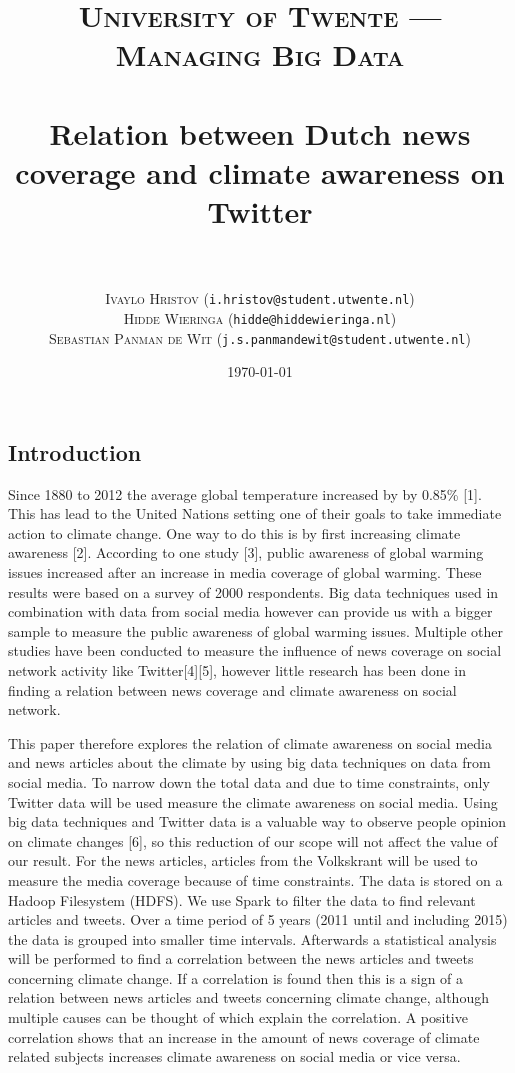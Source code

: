 \documentclass[paper=a4, fontsize=9px]{scrartcl} %
\title{	
\normalfont \normalsize 
\textsc{University of Twente --- Managing Big Data} \\ [5pt] %
\horrule{0.5pt} \\[0.4cm] %
\huge Relation between Dutch news coverage and climate awareness on Twitter \\ %
\horrule{2pt} \\[0.0cm] %
}
\author{{\small \textsc{Ivaylo Hristov} (\texttt{i.hristov@student.utwente.nl})}\\{\small \textsc{Hidde Wieringa} (\texttt{hidde@hiddewieringa.nl})}\\{\small \textsc{Sebastian Panman de Wit} (\texttt{j.s.panmandewit@student.utwente.nl})}} %
\date{\normalsize\today} %
\numberwithin{equation}{section} %
\numberwithin{figure}{section} %
\numberwithin{table}{section} %
\begin{document}
\maketitle %

\begin{multicols}{2}

\section{Introduction}

Since 1880 to 2012 the average global temperature increased by by 0.85\% [1]. This has lead to the United Nations setting one of their goals to take immediate action to climate change. One way to do this is by first increasing climate awareness [2]. According to one study [3], public awareness of global warming issues increased after an increase in media coverage of global warming. These results were based on a survey of 2000 respondents. Big data techniques used in combination with data from social media however can provide us with a bigger sample to measure the public awareness of global warming issues. Multiple other studies have been conducted to measure the influence of news coverage on social network activity like Twitter[4][5], however little research has been done in finding a relation between news coverage and climate awareness on social network.

This paper therefore explores the relation of climate awareness on social media and news articles about the climate by using big data techniques on data from social media. To narrow down the total data and due to time constraints, only Twitter data will be used measure the climate awareness on social media. Using big data techniques and Twitter data is a valuable way to observe people opinion on climate changes [6], so this reduction of our scope will not affect the value of our result. For the news articles, articles from the Volkskrant will be used to measure the media coverage because of time constraints. The data is stored on a Hadoop Filesystem (HDFS). We use Spark to filter the data to find relevant articles and tweets. Over a time period of 5 years (2011 until and including 2015) the data is grouped into smaller time intervals. Afterwards a statistical analysis will be performed to find a correlation between the news articles and tweets concerning climate change. If a correlation is found then this is a sign of a relation between news articles and tweets concerning climate change, although multiple causes can be thought of which explain the correlation. A positive correlation shows that an increase in the amount of news coverage of climate related subjects increases climate awareness on social media or vice versa.


\end{multicols}
\end{document}
